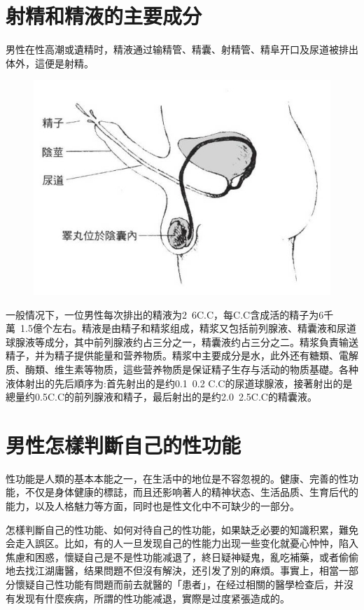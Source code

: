 \documentclass[12pt,UTF8]{ctexbook}
\begin{document}
\section{射精和精液的主要成分}

男性在性高潮或遺精时，精液通过输精管、精囊、射精管、精阜开口及尿道被排出体外，這便是射精。

\begin{figure}[htbp]
	\centering
	\includegraphics[width=0.7\linewidth]{5}
	\caption{}
\end{figure}

一般情况下，一位男性每次排出的精液为2~6C.C，每C.C含成活的精子为6千萬~1.5億个左右。精液是由精子和精浆组成，精浆又包括前列腺液、精囊液和尿道球腺液等成分，其中前列腺液约占三分之一，精囊液约占三分之二。精浆負責输送精子，并为精子提供能量和营养物质。精浆中主要成分是水，此外还有糖類、電解质、酶類、维生素等物质，這些营养物质是保证精子生存与活动的物质基礎。各种液体射出的先后順序为:首先射出的是约0.1~0.2 C.C的尿道球腺液，接著射出的是總量约0.5C.C的前列腺液和精子，最后射出的是约2.0~2.5C.C的精囊液。

\section{男性怎樣判斷自己的性功能}

性功能是人類的基本本能之一，在生活中的地位是不容忽視的。健康、完善的性功能，不仅是身体健康的標誌，而且还影响著人的精神状态、生活品质、生育后代的能力，以及人格魅力等方面，同时也是性文化中不可缺少的一部分。

怎樣判斷自己的性功能、如何对待自己的性功能，如果缺乏必要的知識积累，難免会走入誤区。比如，有的人一旦发现自己的性能力出现一些变化就憂心忡忡，陷入焦慮和困惑，懷疑自己是不是性功能减退了，終日疑神疑鬼，亂吃補藥，或者偷偷地去找江湖庸醫，结果問題不但沒有解決，还引发了別的麻煩。事實上，相當一部分懷疑自己性功能有問題而前去就醫的「患者」，在经过相關的醫學检查后，并沒有发现有什麼疾病，所謂的性功能减退，實際是过度紧張造成的。
\end{document}
